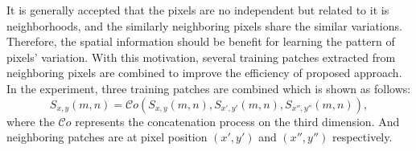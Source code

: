\documentclass[journal]{IEEEtran}
\begin{document}
It is generally accepted that the pixels are no independent but related to it is neighborhoods,
and the similarly neighboring pixels share the similar variations.
%
Therefore,
the spatial information should be benefit for learning the pattern of pixels' variation.
%
With this motivation,
several training patches extracted from neighboring pixels are combined to improve the efficiency of proposed approach.
%
In the experiment, three training patches are combined which is shown as follows:
\begin{equation}
    S_{x,y}(m,n) = \mathcal{C}o(S_{x,y}(m,n), S_{x', y'}(m,n), S_{x'', y ''}(m, n)),
\end{equation}
where the $\mathcal{C}o$ represents the concatenation process on the third dimension.
And neighboring patches are at pixel position $(x',y')$ and $(x'',y'')$ respectively.
% 
% 
\end{document}
